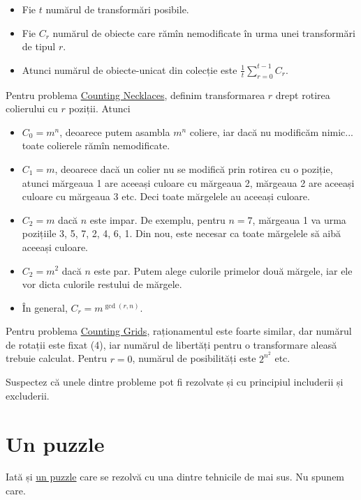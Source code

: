 \documentclass[../main.tex]{subfiles}
\begin{document}
\begin{itemize}
  \item Fie $t$ numărul de transformări posibile.
  \item Fie $C_r$ numărul de obiecte care rămîn nemodificate în urma unei transformări de tipul $r$.
  \item Atunci numărul de obiecte-unicat din colecție este $\frac{1}{t} \sum_{r=0}^{t-1} C_r$.
\end{itemize}

Pentru problema \hyperref[problem:counting-necklaces]{Counting Necklaces}, definim transformarea $r$ drept rotirea colierului cu $r$ poziții. Atunci

\begin{itemize}
  \item $C_0 = m^n$, deoarece putem asambla $m^n$ coliere, iar dacă nu modificăm nimic... toate colierele rămîn nemodificate. 
  \item $C_1 = m$, deoarece dacă un colier nu se modifică prin rotirea cu o poziție, atunci mărgeaua 1 are aceeași culoare cu mărgeaua 2, mărgeaua 2 are aceeași culoare cu mărgeaua 3 etc. Deci toate mărgelele au aceeași culoare.
  \item $C_2 = m$ dacă $n$ este impar. De exemplu, pentru $n = 7$, mărgeaua 1 va urma pozițiile 3, 5, 7, 2, 4, 6, 1. Din nou, este necesar ca toate mărgelele să aibă aceeași culoare.
  \item $C_2 = m^{2}$ dacă $n$ este par. Putem alege culorile primelor două mărgele, iar ele vor dicta culorile restului de mărgele.
  \item În general, $C_r = m^{\gcd(r, n)}$.
\end{itemize}

Pentru problema \hyperref[problem:counting-grids]{Counting Grids}, raționamentul este foarte similar, dar numărul de rotații este fixat (4), iar numărul de libertăți pentru o transformare aleasă trebuie calculat. Pentru $r = 0$, numărul de posibilități este $2^{n^2}$ etc.

Suspectez că unele dintre probleme pot fi rezolvate și cu principiul includerii și excluderii.

\section{Un puzzle}

Iată și \href{https://math.stackexchange.com/q/5595}{un puzzle} care se rezolvă cu una dintre tehnicile de mai sus. Nu spunem care. 
\end{document}
